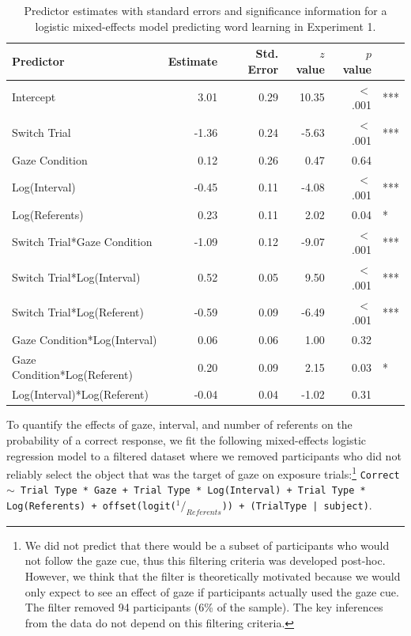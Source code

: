 \documentclass[authoryear, review]{elsarticle}
\begin{document}
\begin{table}[tb]
\centering
\begin{tabular}{lrrrrl}
 Predictor & Estimate & Std. Error & $z$ value & $p$ value &  \\ 
  \hline
Intercept & 3.01 & 0.29 & 10.35 & $<$ .001 & *** \\ 
  Switch Trial & -1.36 & 0.24 & -5.63 & $<$ .001 & *** \\ 
  Gaze Condition & 0.12 & 0.26 & 0.47 & 0.64 &  \\ 
  Log(Interval) & -0.45 & 0.11 & -4.08 & $<$ .001 & *** \\ 
  Log(Referents) & 0.23 & 0.11 & 2.02 & 0.04 & * \\ 
  Switch Trial*Gaze Condition & -1.09 & 0.12 & -9.07 & $<$ .001 & *** \\ 
  Switch Trial*Log(Interval) & 0.52 & 0.05 & 9.50 & $<$ .001 & *** \\ 
  Switch Trial*Log(Referent) & -0.59 & 0.09 & -6.49 & $<$ .001 & *** \\ 
  Gaze Condition*Log(Interval) & 0.06 & 0.06 & 1.00 & 0.32 &  \\ 
  Gaze Condition*Log(Referent) & 0.20 & 0.09 & 2.15 & 0.03 & * \\ 
  Log(Interval)*Log(Referent) & -0.04 & 0.04 & -1.02 & 0.31 &  \\ 
   \hline
\end{tabular}
\caption{Predictor estimates with standard errors and significance information for a logistic mixed-effects model predicting word learning in Experiment 1.} 
\label{tab:exp1_reg}
\end{table}

To quantify the effects of gaze, interval, and number of referents on
the probability of a correct response, we fit the following
mixed-effects logistic regression model to a filtered dataset where we
removed participants who did not reliably select the object that was the
target of gaze on exposure trials:\footnote{We did not predict that
  there would be a subset of participants who would not follow the gaze
  cue, thus this filtering criteria was developed post-hoc. However, we
  think that the filter is theoretically motivated because we would only
  expect to see an effect of gaze if participants actually used the gaze
  cue. The filter removed 94 participants (6\% of the sample). The key
  inferences from the data do not depend on this filtering criteria.}
\texttt{Correct $\sim$ Trial Type * Gaze + Trial Type * Log(Interval) + Trial Type * \\ Log(Referents) + offset(logit($^1/_{Referents}$)) + (TrialType | subject)}.
\end{document}

